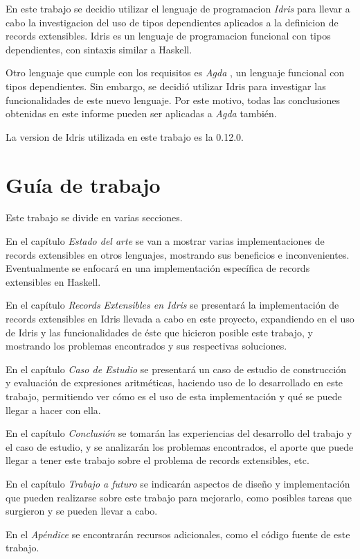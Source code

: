 En este trabajo se decidio utilizar el lenguaje de programacion \textit{Idris} \cite{brady:idris-jfp13} para llevar a cabo la investigacion del uso de tipos dependientes aplicados a la definicion de records extensibles. Idris es un lenguaje de programacion funcional con tipos dependientes, con sintaxis similar a Haskell.

Otro lenguaje que cumple con los requisitos es \textit{Agda} \cite{Norell:2009:DTP:1481861.1481862}, un lenguaje funcional con tipos dependientes. Sin embargo, se decidió utilizar Idris para investigar las funcionalidades de este nuevo lenguaje.
Por este motivo, todas las conclusiones obtenidas en este informe pueden ser aplicadas a \textit{Agda} también.

La version de Idris utilizada en este trabajo es la 0.12.0.

\section{Guía de trabajo}

Este trabajo se divide en varias secciones. 

En el capítulo \textit{Estado del arte} se van a mostrar varias implementaciones de records extensibles en otros lenguajes, mostrando sus beneficios e inconvenientes. Eventualmente se enfocará en una implementación específica de records extensibles en Haskell.

En el capítulo \textit{Records Extensibles en Idris} se presentará la implementación de records extensibles en Idris llevada a cabo en este proyecto, expandiendo en el uso de Idris y las funcionalidades de éste que hicieron posible este trabajo, y mostrando los problemas encontrados y sus respectivas soluciones.

En el capítulo \textit{Caso de Estudio} se presentará un caso de estudio de construcción y evaluación de expresiones aritméticas, haciendo uso de lo desarrollado en este trabajo, permitiendo ver cómo es el uso de esta implementación y qué se puede llegar a hacer con ella.

En el capítulo \textit{Conclusión} se tomarán las experiencias del desarrollo del trabajo y el caso de estudio, y se analizarán los problemas encontrados, el aporte que puede llegar a tener este trabajo sobre el problema de records extensibles, etc.

En el capítulo \textit{Trabajo a futuro} se indicarán aspectos de diseño y implementación que pueden realizarse sobre este trabajo para mejorarlo, como posibles tareas que surgieron y se pueden llevar a cabo.

En el \textit{Apéndice} se encontrarán recursos adicionales, como el código fuente de este trabajo.
